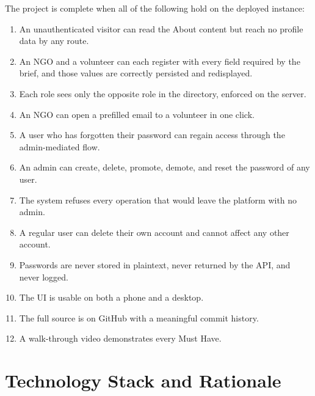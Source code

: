 \documentclass[11pt,letterpaper]{article}
\begin{document}
The project is complete when all of the following hold on the deployed instance:

\begin{enumerate}
  \item An unauthenticated visitor can read the About content but reach no
        profile data by any route.
  \item An NGO and a volunteer can each register with every field required by
        the brief, and those values are correctly persisted and redisplayed.
  \item Each role sees only the opposite role in the directory, enforced on the server.
  \item An NGO can open a prefilled email to a volunteer in one click.
  \item A user who has forgotten their password can regain access through the
        admin-mediated flow.
  \item An admin can create, delete, promote, demote, and reset the password of any user.
  \item The system refuses every operation that would leave the platform with no admin.
  \item A regular user can delete their own account and cannot affect any other account.
  \item Passwords are never stored in plaintext, never returned by the API, and never logged.
  \item The UI is usable on both a phone and a desktop.
  \item The full source is on GitHub with a meaningful commit history.
  \item A walk-through video demonstrates every Must Have.
\end{enumerate}

\section{Technology Stack and Rationale}
\end{document}
